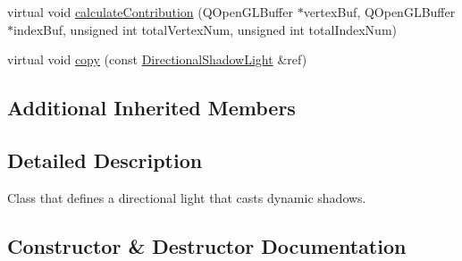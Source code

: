 \begin{DoxyCompactItemize}
\item 
virtual void \mbox{\hyperlink{class_geometry_engine_1_1_geometry_world_item_1_1_geometry_light_1_1_directional_shadow_light_a712d0b0a0573ebd246a4a8aa6b2b667a}{calculate\+Contribution}} (Q\+Open\+G\+L\+Buffer $\ast$vertex\+Buf, Q\+Open\+G\+L\+Buffer $\ast$index\+Buf, unsigned int total\+Vertex\+Num, unsigned int total\+Index\+Num)
\item 
virtual void \mbox{\hyperlink{class_geometry_engine_1_1_geometry_world_item_1_1_geometry_light_1_1_directional_shadow_light_a9dfe76fbcd9c6f7047d99d7eff78c6a5}{copy}} (const \mbox{\hyperlink{class_geometry_engine_1_1_geometry_world_item_1_1_geometry_light_1_1_directional_shadow_light}{Directional\+Shadow\+Light}} \&ref)
\end{DoxyCompactItemize}
\subsection*{Additional Inherited Members}


\subsection{Detailed Description}
Class that defines a directional light that casts dynamic shadows. 

\subsection{Constructor \& Destructor Documentation}
\mbox{\label{class_geometry_engine_1_1_geometry_world_item_1_1_geometry_light_1_1_directional_shadow_light_a537400fc0efaad0c4b21c902b6740eeb}} 
